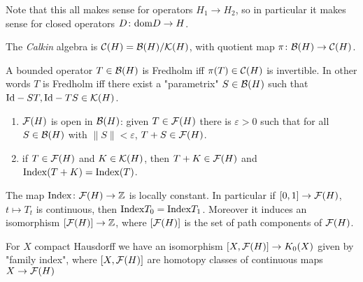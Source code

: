 \noindent Note that this all makes sense for operators $H_1\to H_2$, so in particular it makes sense for closed operators $D\colon\mathrm{dom} D\to H$.

\begin{definition}
 The \emph{Calkin} algebra is $\mathcal{C}(H)=\mathcal{B}(H)/\mathcal{K}(H)$, with quotient map $\pi\colon\mathcal{B}(H)\to\mathcal{C}(H)$.
\end{definition}

\begin{theorem}[Atkinson]
 A bounded operator $T\in\mathcal{B}(H)$ is Fredholm iff $\pi(T)\in\mathcal{C}(H)$ is invertible. In other words $T$ is Fredholm iff there exist a "parametrix" $S\in\mathcal{B}(H)$ such that $\mathrm{Id}-ST,\mathrm{Id}-TS\in\mathcal{K}(H)$. 
\end{theorem}

\begin{corollary}\noindent
 \begin{enumerate}
  \item $\mathcal{F}(H)$ is open in $\mathcal{B}(H)$: given $T\in\mathcal{F}(H)$ there is $\varepsilon>0$ such that for all $S\in\mathcal{B}(H)$ with $\|S\|<\varepsilon$, $T+S\in\mathcal{F}(H)$.
  \item if $T\in\mathcal{F}(H)$ and $K\in\mathcal{K}(H)$, then $T+K\in\mathcal{F}(H)$ and $\mathrm{Index}(T+K)=\mathrm{Index}(T)$.
 \end{enumerate}
\end{corollary}

\begin{theorem}
 The map $\mathrm{Index}\colon\mathcal{F}(H)\to\mathbb{Z}$ is locally constant. In particular if $[0,1]\to\mathcal{F}(H)$, $t\mapsto T_t$ is continuous, then $\mathrm{Index} T_0=\mathrm{Index} T_1$. Moreover it induces an isomorphism $[\mathcal{F}(H)]\to\mathbb{Z}$, where $[\mathcal{F}(H)]$ is the set of path components of $\mathcal{F}(H)$.
\end{theorem}

\begin{theorem} 
 For $X$ compact Hausdorff we have an isomorphism $[X,\mathcal{F}(H)]\to K_0(X)$ given by "family index", where $[X,\mathcal{F}(H)]$ are homotopy classes of continuous maps $X\to\mathcal{F}(H)$
\end{theorem}